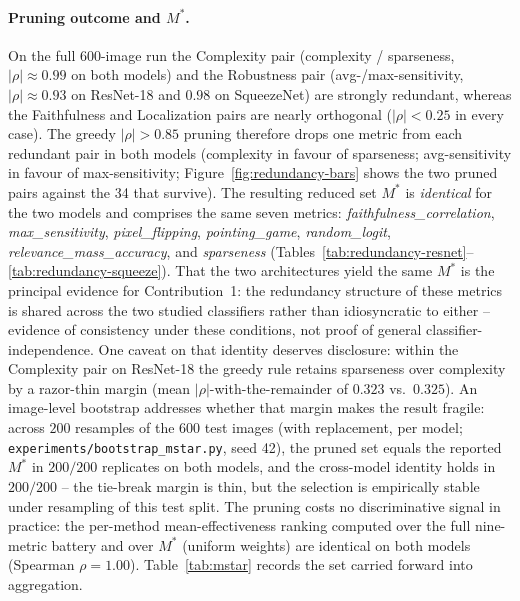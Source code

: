 \paragraph{Pruning outcome and $M^{*}$.}
On the full 600-image run the Complexity pair (complexity / sparseness,
$|\rho| \approx 0.99$ on both models) and the Robustness pair
(avg-/max-sensitivity, $|\rho| \approx 0.93$ on ResNet-18 and $0.98$ on
SqueezeNet) are strongly redundant, whereas the Faithfulness and Localization
pairs are nearly orthogonal ($|\rho| < 0.25$ in every case). The greedy
$|\rho| > 0.85$ pruning therefore drops one metric from each redundant pair
in both models (complexity in favour of sparseness; avg-sensitivity in favour
of max-sensitivity; Figure~\ref{fig:redundancy-bars} shows the two pruned
pairs against the 34 that survive). The resulting reduced set $M^{*}$ is \emph{identical} for
the two models and comprises the same seven metrics:
\emph{faithfulness\_correlation}, \emph{max\_sensitivity},
\emph{pixel\_flipping}, \emph{pointing\_game}, \emph{random\_logit},
\emph{relevance\_mass\_accuracy}, and \emph{sparseness}
(Tables~\ref{tab:redundancy-resnet}--\ref{tab:redundancy-squeeze}). That the
two architectures yield the same $M^{*}$ is the principal evidence for
Contribution~1: the redundancy structure of these metrics is shared across
the two studied classifiers rather than idiosyncratic to either -- evidence
of consistency under these conditions, not proof of general
classifier-independence. One caveat on that identity
deserves disclosure: within the Complexity pair on ResNet-18 the greedy rule
retains sparseness over complexity by a razor-thin margin (mean
$|\rho|$-with-the-remainder of $0.323$ vs.\ $0.325$). An image-level
bootstrap addresses whether that margin makes the result fragile: across
$200$ resamples of the $600$ test images (with replacement, per model;
\texttt{experiments/bootstrap\_mstar.py}, seed 42), the pruned set equals
the reported $M^{*}$ in $200/200$ replicates on both models, and the
cross-model identity holds in $200/200$ -- the tie-break margin is thin, but
the selection is empirically stable under resampling of this test split.
The pruning costs no
discriminative signal in practice: the per-method mean-effectiveness ranking
computed over the full nine-metric battery and over $M^{*}$ (uniform
weights) are identical on both models (Spearman $\rho = 1.00$).
Table~\ref{tab:mstar} records
the set carried forward into aggregation.

